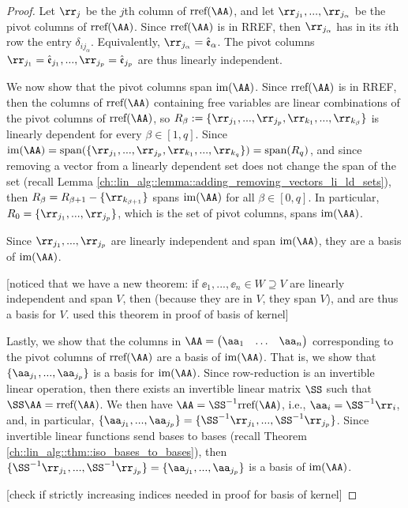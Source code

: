 \begin{proof}
    Let $\rr_j$ be the $j$th column of $\rref(\AA)$, and let $\rr_{j_1}, ..., \rr_{j_\alpha}$ be the pivot columns of $\rref(\AA)$. Since $\rref(\AA)$ is in RREF, then $\rr_{j_\alpha}$ has in its $i$th row the entry $\delta_{ij_\alpha}$. Equivalently, $\rr_{j_\alpha} = \see_\alpha$. The pivot columns $\rr_{j_1} = \see_{j_1}, ..., \rr_{j_p} = \see_{j_p}$ are thus linearly independent. 

    We now show that the pivot columns span $\im(\AA)$. Since $\rref(\AA)$ is in RREF, then the columns of $\rref(\AA)$ containing free variables are linear combinations of the pivot columns of $\rref(\AA)$, so $R_\beta := \{\rr_{j_1}, ..., \rr_{j_p}, \rr_{k_1}, ..., \rr_{k_\beta}\}$ is linearly dependent for every $\beta \in [1, q]$. Since $\im(\AA) = \spann(\{\rr_{j_1}, ..., \rr_{j_p}, \rr_{k_1}, ..., \rr_{k_q}\}) = \spann(R_q)$, and since removing a vector from a linearly dependent set does not change the span of the set (recall Lemma \ref{ch::lin_alg::lemma::adding_removing_vectors_li_ld_sets}), then $R_\beta = R_{\beta + 1} - \{\rr_{k_{\beta + 1}}\}$ spans $\im(\AA)$ for all $\beta \in [0, q]$. In particular, $R_0 = \{\rr_{j_1}, ..., \rr_{j_p}\}$, which is the set of pivot columns, spans $\im(\AA)$. 

    Since $\rr_{j_1}, ..., \rr_{j_p}$ are linearly independent and span $\im(\AA)$, they are a basis of $\im(\AA)$.

    [noticed that we have a new theorem: if $\ee_1, ..., \ee_n \in W \supseteq V$ are linearly independent and span $V$, then (because they are in $V$, they span $V$), and are thus a basis for $V$. used this theorem in proof of basis of kernel]

    Lastly, we show that the columns in $\AA = \begin{pmatrix} \aa_1 & \hdots & \aa_n \end{pmatrix}$ corresponding to the pivot columns of $\rref(\AA)$ are a basis of $\im(\AA)$. That is, we show that $\{\aa_{j_1}, ..., \aa_{j_p}\}$ is a basis for $\im(\AA)$. Since row-reduction is an invertible linear operation, then there exists an invertible linear matrix $\SS$ such that $\SS \AA = \rref(\AA)$. We then have $\AA = \SS^{-1} \rref(\AA)$, i.e., $\aa_i = \SS^{-1} \rr_i$, and, in particular, $\{\aa_{j_1}, ..., \aa_{j_p}\} = \{\SS^{-1} \rr_{j_1}, ..., \SS^{-1} \rr_{j_p}\}$. Since invertible linear functions send bases to bases (recall Theorem \ref{ch::lin_alg::thm::iso_bases_to_bases}), then $\{\SS^{-1} \rr_{j_1}, ..., \SS^{-1} \rr_{j_p}\} = \{\aa_{j_1}, ..., \aa_{j_p}\}$ is a basis of $\im(\AA)$.

    [check if strictly increasing indices needed in proof for basis of kernel]
\end{proof}


